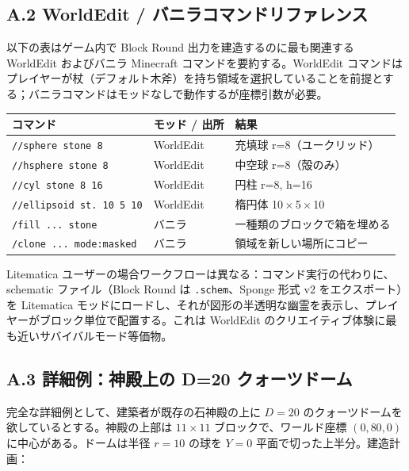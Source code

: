 \documentclass[12pt,a4paper]{scrartcl}
\newcommand{\code}[1]{\texttt{\small #1}}
\newcommand{\cmd}[1]{\textcolor{earth}{\texttt{\small #1}}}
\begin{document}
\subsection*{A.2 WorldEdit / バニラコマンドリファレンス}
以下の表はゲーム内で Block Round 出力を建造するのに最も関連する WorldEdit およびバニラ Minecraft コマンドを要約する。WorldEdit コマンドはプレイヤーが杖（デフォルト木斧）を持ち領域を選択していることを前提とする；バニラコマンドはモッドなしで動作するが座標引数が必要。

\vspace{0.4em}
\begin{center}
\small
\begin{tabularx}{\textwidth}{@{}llX@{}}
\toprule
\textbf{コマンド} & \textbf{モッド / 出所} & \textbf{結果} \\
\midrule
\cmd{//sphere stone 8}     & WorldEdit & 充填球 r=8（ユークリッド）  \\
\cmd{//hsphere stone 8}    & WorldEdit & 中空球 r=8（殻のみ）  \\
\cmd{//cyl stone 8 16}     & WorldEdit & 円柱 r=8, h=16  \\
\cmd{//ellipsoid st. 10 5 10} & WorldEdit & 楕円体 10\,$\times$\,5\,$\times$\,10  \\
\cmd{/fill ... stone}      & バニラ & 一種類のブロックで箱を埋める  \\
\cmd{/clone ... mode:masked} & バニラ & 領域を新しい場所にコピー  \\
\bottomrule
\end{tabularx}
\end{center}

Litematica ユーザーの場合ワークフローは異なる：コマンド実行の代わりに、schematic ファイル（Block Round は \code{.schem}、Sponge 形式 v2 をエクスポート）を Litematica モッドにロードし、それが図形の半透明な幽霊を表示し、プレイヤーがブロック単位で配置する。これは WorldEdit のクリエイティブ体験に最も近いサバイバルモード等価物。

\subsection*{A.3 詳細例：神殿上の D=20 クォーツドーム}
完全な詳細例として、建築者が既存の石神殿の上に $D=20$ のクォーツドームを欲しているとする。神殿の上部は $11 \times 11$ ブロックで、ワールド座標 $(0,80,0)$ に中心がある。ドームは半径 $r=10$ の球を $Y=0$ 平面で切った上半分。建造計画：
\end{document}
